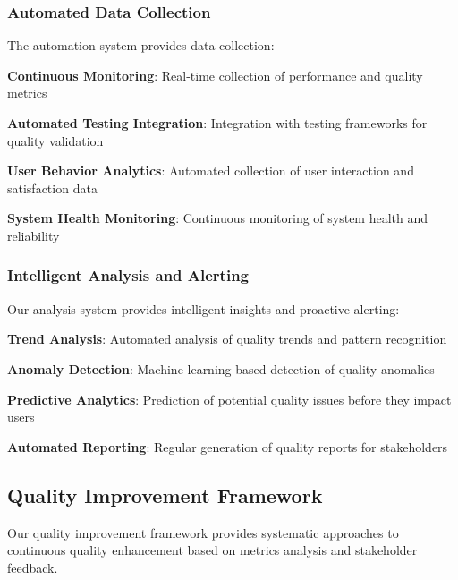\subsubsection*{Automated Data Collection}

The automation system provides data collection:

\begin{compactlist}
    \item \textbf{Continuous Monitoring}: Real-time collection of performance and quality metrics
    \item \textbf{Automated Testing Integration}: Integration with testing frameworks for quality validation
    \item \textbf{User Behavior Analytics}: Automated collection of user interaction and satisfaction data
    \item \textbf{System Health Monitoring}: Continuous monitoring of system health and reliability
\end{compactlist}

\subsubsection*{Intelligent Analysis and Alerting}

Our analysis system provides intelligent insights and proactive alerting:

\begin{compactlist}
    \item \textbf{Trend Analysis}: Automated analysis of quality trends and pattern recognition
    \item \textbf{Anomaly Detection}: Machine learning-based detection of quality anomalies
    \item \textbf{Predictive Analytics}: Prediction of potential quality issues before they impact users
    \item \textbf{Automated Reporting}: Regular generation of quality reports for stakeholders
\end{compactlist}

\subsection*{Quality Improvement Framework}

Our quality improvement framework provides systematic approaches to continuous quality enhancement based on metrics analysis and stakeholder feedback.

